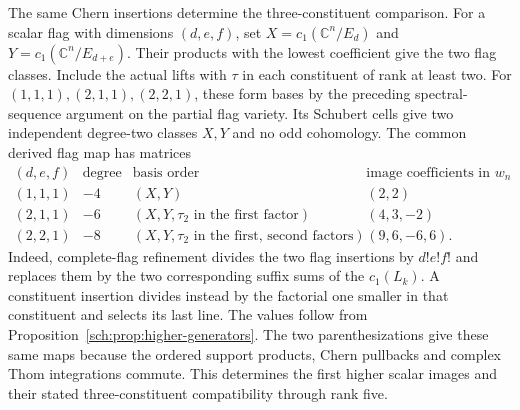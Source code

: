 The same Chern insertions determine the three-constituent comparison.
For a scalar flag with dimensions $(d,e,f)$, set
$X=c_1(\mathbb C^n/E_d)$ and
$Y=c_1(\mathbb C^n/E_{d+e})$.
Their products with the lowest coefficient give the two flag classes.
Include the actual lifts with $\tau$ in each constituent of rank
at least two. For $(1,1,1),(2,1,1),(2,2,1)$, these form bases by
the preceding spectral-sequence argument on the partial flag variety.
Its Schubert cells give two independent degree-two classes $X,Y$
and no odd cohomology.
The common derived flag map has matrices
\[
\begin{array}{c|c|c|c}
 (d,e,f)&\text{degree}&\text{basis order}&\text{image coefficients in }w_n\\\hline
 (1,1,1)&-4&(X,Y)&(2,2)\\
 (2,1,1)&-6&(X,Y,\tau_2\text{ in the first factor})&(4,3,-2)\\
 (2,2,1)&-8&(X,Y,\tau_2\text{ in the first, second factors})&(9,6,-6,6).
\end{array}
\]
Indeed, complete-flag refinement divides the two flag insertions
by $d!e!f!$ and replaces them by the two corresponding suffix sums
of the $c_1(L_k)$. A constituent insertion divides instead by the
factorial one smaller in that constituent and selects its last line.
The values follow from Proposition~\ref{sch:prop:higher-generators}.
The two parenthesizations give these same maps because the ordered
support products, Chern pullbacks and complex Thom integrations commute.
This determines the first higher scalar images and their stated
three-constituent compatibility through rank five.
